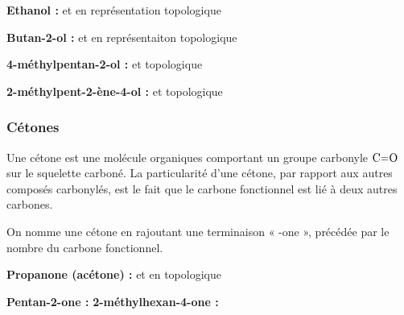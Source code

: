 \documentclass[11pt,a4paper]{article}
\begin{document}
\begin{eg}

\textbf{Ethanol : } 
 \quad \quad et en représentation topologique \quad  {}
\vspace{0.5cm}

\textbf{Butan-2-ol : }  \quad  et en représentaiton topologique \quad  {}
\vspace{.5cm}

\textbf{4-méthylpentan-2-ol : }
 et topologique 
\vspace{.5cm}

\textbf{ 2-méthylpent-2-ène-4-ol : }
  \; et topologique \; 
\end{eg}

\subsubsection*{Cétones}
Une cétone est une molécule organiques comportant un groupe carbonyle $\ce{C=O}$ sur le squelette carboné. La particularité d'une cétone, par rapport aux autres composés carbonylés, est le fait que le carbone fonctionnel est lié à deux autres carbones. 

On nomme une cétone en rajoutant une terminaison « -one », précédée par le nombre du carbone fonctionnel. 

\begin{eg}

\textbf{Propanone (acétone) : }
 \quad et en topologique

\textbf{Pentan-2-one : } \hspace{5cm} \textbf{2-méthylhexan-4-one : }
\vspace{2cm}
\end{eg}
\end{document}
